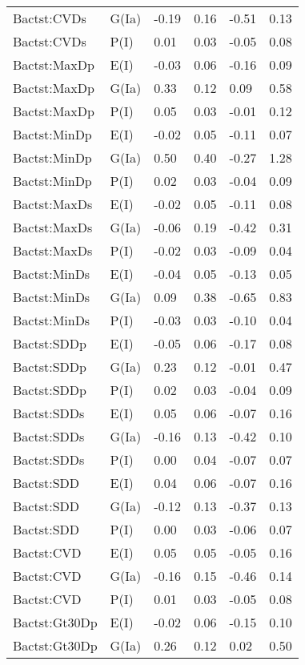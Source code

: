 \begin{center}
\begin{longtable}{|p{1.1in}|p{0.7in}|p{0.7in}|p{0.6in}|p{0.6in}|p{0.6in}|}
  Bactst:CVDs & G(Ia) & -0.19 & 0.16 & -0.51 & 0.13 \\ 
  Bactst:CVDs & P(I) & 0.01 & 0.03 & -0.05 & 0.08 \\ 
  Bactst:MaxDp & E(I) & -0.03 & 0.06 & -0.16 & 0.09 \\ 
  Bactst:MaxDp & G(Ia) & 0.33 & 0.12 & 0.09 & 0.58 \\ 
  Bactst:MaxDp & P(I) & 0.05 & 0.03 & -0.01 & 0.12 \\ 
  Bactst:MinDp & E(I) & -0.02 & 0.05 & -0.11 & 0.07 \\ 
  Bactst:MinDp & G(Ia) & 0.50 & 0.40 & -0.27 & 1.28 \\ 
  Bactst:MinDp & P(I) & 0.02 & 0.03 & -0.04 & 0.09 \\ 
  Bactst:MaxDs & E(I) & -0.02 & 0.05 & -0.11 & 0.08 \\ 
  Bactst:MaxDs & G(Ia) & -0.06 & 0.19 & -0.42 & 0.31 \\ 
  Bactst:MaxDs & P(I) & -0.02 & 0.03 & -0.09 & 0.04 \\ 
  Bactst:MinDs & E(I) & -0.04 & 0.05 & -0.13 & 0.05 \\ 
  Bactst:MinDs & G(Ia) & 0.09 & 0.38 & -0.65 & 0.83 \\ 
  Bactst:MinDs & P(I) & -0.03 & 0.03 & -0.10 & 0.04 \\ 
  Bactst:SDDp & E(I) & -0.05 & 0.06 & -0.17 & 0.08 \\ 
  Bactst:SDDp & G(Ia) & 0.23 & 0.12 & -0.01 & 0.47 \\ 
  Bactst:SDDp & P(I) & 0.02 & 0.03 & -0.04 & 0.09 \\ 
  Bactst:SDDs & E(I) & 0.05 & 0.06 & -0.07 & 0.16 \\ 
  Bactst:SDDs & G(Ia) & -0.16 & 0.13 & -0.42 & 0.10 \\ 
  Bactst:SDDs & P(I) & 0.00 & 0.04 & -0.07 & 0.07 \\ 
  Bactst:SDD & E(I) & 0.04 & 0.06 & -0.07 & 0.16 \\ 
  Bactst:SDD & G(Ia) & -0.12 & 0.13 & -0.37 & 0.13 \\ 
  Bactst:SDD & P(I) & 0.00 & 0.03 & -0.06 & 0.07 \\ 
  Bactst:CVD & E(I) & 0.05 & 0.05 & -0.05 & 0.16 \\ 
  Bactst:CVD & G(Ia) & -0.16 & 0.15 & -0.46 & 0.14 \\ 
  Bactst:CVD & P(I) & 0.01 & 0.03 & -0.05 & 0.08 \\ 
  Bactst:Gt30Dp & E(I) & -0.02 & 0.06 & -0.15 & 0.10 \\ 
  Bactst:Gt30Dp & G(Ia) & 0.26 & 0.12 & 0.02 & 0.50 \\ 

\end{longtable}
\end{center}
